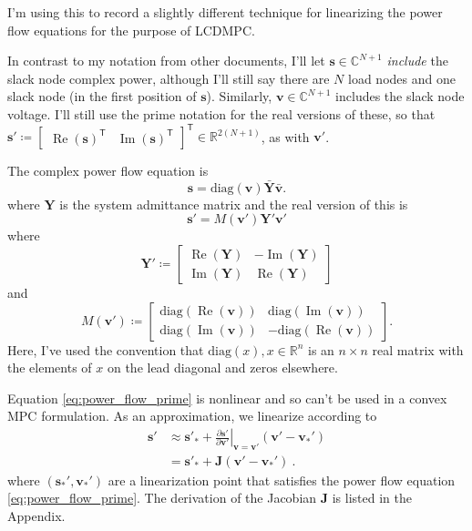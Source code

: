 \documentclass{article}
\newcommand{\tran}{^{\mathsf{T}}}
\renewcommand{\Re}{\ensuremath{\operatorname{Re}}}
\renewcommand{\Im}{\ensuremath{\operatorname{Im}}}
\begin{document}
	
I'm using this to record a slightly different technique for linearizing the 
power flow equations for the purpose of LCDMPC.

In contrast to my notation from other documents, I'll let 
$\mathbf{s} \in \mathbb{C}^{N+1}$ \emph{include} the slack node complex power, 
although I'll still say there are $N$ load nodes and one slack node (in the 
first position of $\mathbf{s}$). Similarly, $\mathbf{v} \in \mathbb{C}^{N+1}$
includes the slack node voltage. I'll still use the prime notation for the real
versions of these, so that 
$\mathbf{s}' \coloneqq \begin{bmatrix} \Re(\mathbf{s})\tran & 
\Im(\mathbf{s})\tran \end{bmatrix}\tran \in \mathbb{R}^{2(N+1)}$, as with 
$\mathbf{v}'$.

The complex power flow equation is
\begin{equation}\label{eq:complex_power_flow}
    \mathbf{s} = \mathrm{diag}(\mathbf{v})\bar{\mathbf{Y}}\bar{\mathbf{v}}.
\end{equation}
where $\mathbf{Y}$ is the system admittance matrix and the real version 
of this is
\begin{equation}\label{eq:power_flow_prime}
    \mathbf{s}' = M(\mathbf{v}')\mathbf{Y}'\mathbf{v}'
\end{equation}
where
$$ \mathbf{Y}' \coloneqq \begin{bmatrix}     
    \Re(\mathbf{Y}) &
    -\Im(\mathbf{Y}) \\
    \Im(\mathbf{Y}) &
    \Re(\mathbf{Y})\end{bmatrix} $$
and
$$ M({\mathbf{v}'}) \coloneqq \begin{bmatrix} 
    \mathrm{diag}(\Re(\mathbf{v})) &
    \mathrm{diag}(\Im(\mathbf{v})) \\
    \mathrm{diag}(\Im(\mathbf{v})) &
    -\mathrm{diag}(\Re(\mathbf{v}))\end{bmatrix}. $$
Here, I've used the convention that $\mathrm{diag}(x), x\in\mathbb{R}^n$ is an 
$n\times n$ real matrix with the elements of $x$ on the lead diagonal and
zeros elsewhere.

Equation \eqref{eq:power_flow_prime} is nonlinear and so can't be used in a 
convex MPC formulation. As an approximation, we linearize according to 
\begin{align}\label{eq:Linearized_power_flow}
    \mathbf{s}' &\approx \mathbf{s}'_* + 
                        \left.\frac{\partial \mathbf{s}'}
                        {\partial \mathbf{v}'}\right\rvert_
                        {\mathbf{v} = \mathbf{v}'}
                        \left(\mathbf{v}' - \mathbf{v}_*'\right) \nonumber \\
                &= \mathbf{s}'_* + \mathbf{J}
                   \left(\mathbf{v}' - \mathbf{v}_*'\right)\:.
\end{align}
where $(\mathbf{s}_*', \mathbf{v}_*')$ are a linearization point that satisfies
the power flow equation \eqref{eq:power_flow_prime}.
The derivation of the Jacobian $\mathbf{J}$ is listed in the Appendix.
\end{document}
